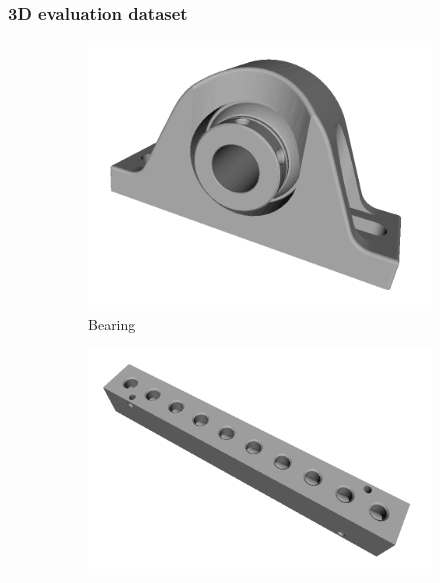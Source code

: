 
\subsubsection{3D evaluation dataset}
\label{sec/reg/3deval}

\begin{figure}[t]
	\centering
	\begin{subfigure}[b]{0.19\linewidth} \centering
		\includegraphics[width=1\linewidth]{./fig/eval/toshiba_bearing1.png}
		\caption{Bearing}
	\end{subfigure}
	\begin{subfigure}[b]{0.19\linewidth} \centering
		\includegraphics[width=1\linewidth]{./fig/eval/toshiba_block1.png}

\end{subfigure}
\end{figure}
